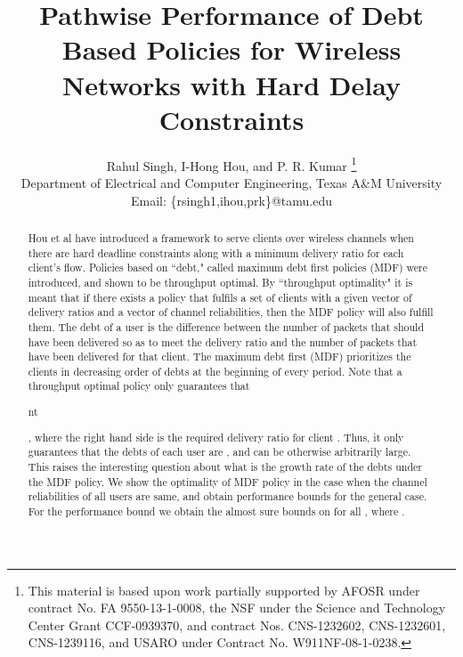 \documentclass[letterpaper, 10 pt, conference]{ieeeconf}
\title{\bf{Pathwise Performance of Debt Based Policies for Wireless Networks with Hard Delay Constraints
}}
\author{Rahul Singh, I-Hong Hou, and P. R. Kumar
  \thanks{This material is based upon work partially supported by AFOSR under contract No. FA 9550-13-1-0008, the NSF under the Science and Technology Center Grant CCF-0939370, and contract Nos. CNS-1232602, CNS-1232601, CNS-1239116, and USARO under Contract No. W911NF-08-1-0238.}
   \\Department of Electrical and Computer Engineering, Texas A\&M University
   \\Email: \{rsingh1,ihou,prk\}@tamu.edu
}
\begin{document}
\maketitle
\begin{abstract}
Hou et al have introduced  a framework to serve clients over wireless channels when there are hard deadline constraints along with a minimum delivery ratio for each client's flow. Policies based on ``debt," called maximum debt first
policies (MDF) were introduced, and shown to be throughput optimal. By ``throughput optimality" it is meant
that if there exists a policy that fulfils a set of clients with a given vector of delivery ratios and a vector of channel reliabilities, then the MDF policy will also fulfill them. The debt of a user is the difference between the number of packets that should have been delivered so as to meet the delivery ratio and the number of packets that have been delivered for that client. The maximum debt first (MDF) prioritizes the clients in decreasing order of debts at the beginning of every period. 
Note that a throughput optimal policy only guarantees that
\begin{small} 
nt
\end{small}, where the right hand side is the required delivery ratio for client . Thus, it only guarantees that the debts of each user are , and can be otherwise arbitrarily large. This raises the interesting question about what is the growth rate of the debts under the MDF policy.
We show the optimality of MDF policy in the case when the channel reliabilities of all users are same, and obtain performance bounds for the general case. For the performance bound we obtain the almost sure bounds on  for all , where .
\end{abstract}
\end{document}

